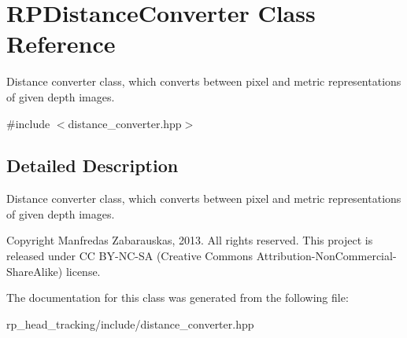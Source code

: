 \hypertarget{class_r_p_distance_converter}{\section{\-R\-P\-Distance\-Converter \-Class \-Reference}
\label{class_r_p_distance_converter}
}


\-Distance converter class, which converts between pixel and metric representations of given depth images.  




{\ttfamily \#include $<$distance\-\_\-converter.\-hpp$>$}



\subsection{\-Detailed \-Description}
\-Distance converter class, which converts between pixel and metric representations of given depth images. 

\begin{DoxyCopyright}{\-Copyright}
\-Manfredas \-Zabarauskas, 2013. \-All rights reserved. \-This project is released under \-C\-C \-B\-Y-\/\-N\-C-\/\-S\-A (\-Creative \-Commons \-Attribution-\/\-Non\-Commercial-\/\-Share\-Alike) license. 
\end{DoxyCopyright}


\-The documentation for this class was generated from the following file\-:\begin{DoxyCompactItemize}
\item 
rp\-\_\-head\-\_\-tracking/include/distance\-\_\-converter.\-hpp\end{DoxyCompactItemize}
